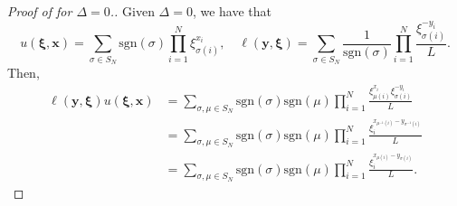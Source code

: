 \documentclass[a4paper,11pt]{article}
\theoremstyle{definition}
\begin{document}
\begin{proof}[Proof of  for $\Delta =0$.]

Given $\Delta=0$, we have that
\begin{equation}
    u(\boldsymbol{\xi},\mathbf{x})=\sum_{\sigma\in S_N}\mathrm{sgn}(\sigma)\prod_{i=1}^N\xi_{\sigma(i)}^{x_i}, \quad \ell(\mathbf{y},\boldsymbol{\xi})=\sum_{\sigma\in S_N}\frac{1}{\mathrm{sgn}(\sigma)}\prod_{i=1}^N\frac{\xi_{\sigma(i)}^{-y_i}}{L}.
\end{equation}
Then,
\begin{equation}
\begin{split}
    \ell(\mathbf{y},\boldsymbol{\xi})u(\boldsymbol{\xi},\mathbf{x}) &= \sum_{\sigma, \mu\in S_N} \mathrm{sgn}(\sigma)\mathrm{sgn}(\mu)\prod_{i=1}^N\frac{\xi_{\mu(i)}^{x_i}\xi_{\sigma(i)}^{-y_i}}{L}\\
    &= \sum_{\sigma, \mu\in S_N} \mathrm{sgn}(\sigma)\mathrm{sgn}(\mu) \prod_{i=1}^N\frac{\xi_{i}^{x_{\mu^{-1}(i)}-y_{\sigma^{-1}(i)}}}{L}\\
    &= \sum_{\sigma, \mu\in S_N} \mathrm{sgn}(\sigma)\mathrm{sgn}(\mu) \prod_{i=1}^N \frac{\xi_{i}^{x_{\mu(i)}-y_{\sigma(i)}}}{L}.
\end{split}
\end{equation}


\end{proof}
\end{document}
